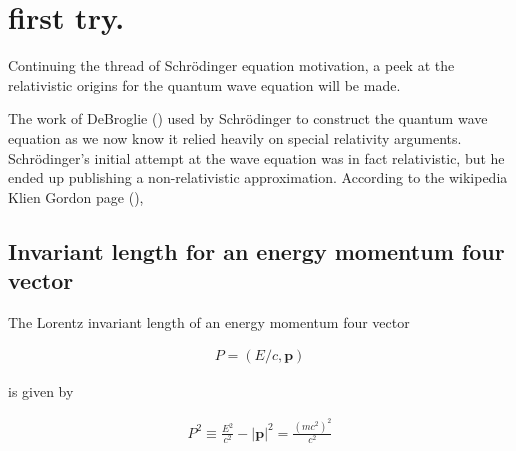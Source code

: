 \documentclass[]{eliblog}
\newcommand{\Abs}[1]{{\left\lvert{#1}\right\rvert}}
\newcommand{\Bp}[0]{\mathbf{p}}
\begin{document}
\section{first try.}
Continuing the thread of Schr\"{o}dinger equation motivation, a peek at the relativistic origins for the quantum wave equation will be made.

The work of DeBroglie (\cite{AFkracklauerDeBroglie}) used by Schr\"{o}dinger to construct the quantum wave equation as we now know it relied heavily on special relativity arguments.  
Schr\"{o}dinger's initial attempt at the wave equation was in fact relativistic, but he ended up publishing a non-relativistic 
approximation.
According to the wikipedia Klien Gordon page (\cite{wikiKG}), 



%
%

\subsection{Invariant length for an energy momentum four vector}

The Lorentz invariant length of an energy momentum four vector

\begin{align}
P = (E/c, \Bp)
\end{align}

is given by

\begin{align}\label{eqn:Psquared}
P^2 \equiv \frac{E^2}{c^2} - \Abs{\Bp}^2 = \frac{(m c^2)^2}{c^2}
\end{align}
\end{document}
